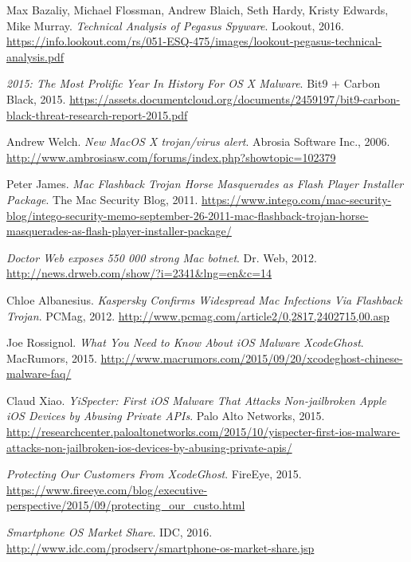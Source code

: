 \documentclass[polish]{kbk}
\begin{document}
\begin{thebibliography}{9}
  Max Bazaliy, Michael Flossman, Andrew Blaich, Seth Hardy, Kristy Edwards, Mike Murray.
  \emph{Technical Analysis of Pegasus Spyware}.
  Lookout, 2016.
  \url{https://info.lookout.com/rs/051-ESQ-475/images/lookout-pegasus-technical-analysis.pdf}
  
  \emph{2015: The Most Prolific Year In History For OS X Malware}.
  Bit9 + Carbon Black, 2015.
  \url{https://assets.documentcloud.org/documents/2459197/bit9-carbon-black-threat-research-report-2015.pdf}
  
  Andrew Welch.
  \emph{New MacOS X trojan/virus alert}.
  Abrosia Software Inc., 2006.
  \url{http://www.ambrosiasw.com/forums/index.php?showtopic=102379}  
  
  Peter James.
  \emph{Mac Flashback Trojan Horse Masquerades as Flash Player Installer Package}.
  The Mac Security Blog, 2011.
  \url{https://www.intego.com/mac-security-blog/intego-security-memo-september-26-2011-mac-flashback-trojan-horse-masquerades-as-flash-player-installer-package/}  

  \emph{Doctor Web exposes 550 000 strong Mac botnet}.
  Dr. Web, 2012.
  \url{http://news.drweb.com/show/?i=2341&lng=en&c=14}  

  Chloe Albanesius.
  \emph{Kaspersky Confirms Widespread Mac Infections Via Flashback Trojan}.
  PCMag, 2012.
  \url{http://www.pcmag.com/article2/0,2817,2402715,00.asp}  
  
  Joe Rossignol.
  \emph{What You Need to Know About iOS Malware XcodeGhost}.
  MacRumors, 2015.
  \url{http://www.macrumors.com/2015/09/20/xcodeghost-chinese-malware-faq/} 
  
  Claud Xiao.
  \emph{YiSpecter: First iOS Malware That Attacks Non-jailbroken Apple iOS Devices by Abusing Private APIs}.
  Palo Alto Networks, 2015.
  \url{http://researchcenter.paloaltonetworks.com/2015/10/yispecter-first-ios-malware-attacks-non-jailbroken-ios-devices-by-abusing-private-apis/} 
  
  \emph{Protecting Our Customers From XcodeGhost}.
  FireEye, 2015.
  \url{https://www.fireeye.com/blog/executive-perspective/2015/09/protecting_our_custo.html} 
  
  \emph{Smartphone OS Market Share}.
  IDC, 2016.
  \url{http://www.idc.com/prodserv/smartphone-os-market-share.jsp} 

\end{thebibliography}
\end{document}
